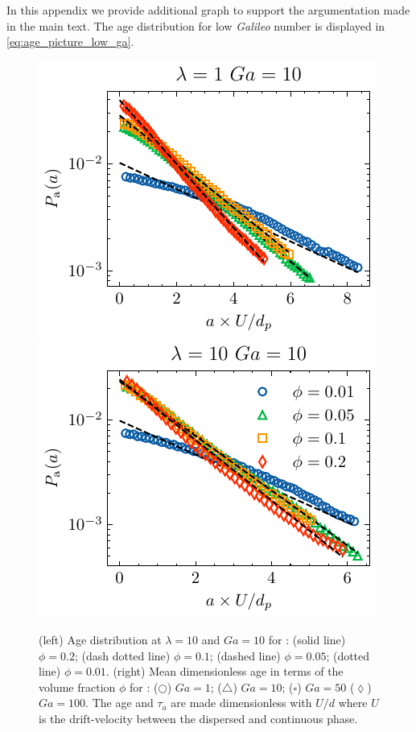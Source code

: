 In this appendix we provide additional graph to support the argumentation made in the main text. 
The age distribution for low \textit{Galileo} number is displayed in \ref{eq:age_picture_low_ga}. 
\begin{figure}[h!]
    \centering
    \includegraphics[height = 0.3\textwidth]{image/HOMOGENEOUS_NEW/Dist/Pa_l_1_Ga_10.pdf}
    \includegraphics[height = 0.3\textwidth]{image/HOMOGENEOUS_NEW/Dist/Pa_l_10_Ga_10.pdf}
    \caption{(left) Age distribution at $\lambda = 10$ and $Ga = 10$ for : (solid line) $\phi = 0.2$; (dash dotted line) $\phi = 0.1$; (dashed line) $\phi =0.05$; (dotted line) $\phi = 0.01$. 
    (right) Mean dimensionless age in terms of the volume fraction $\phi$ for : 
    ($\pmb\bigcirc$) $Ga=1$; ($\pmb\triangle$) $ Ga = 10$; ($\pmb\square$) $Ga = 50$ ($\pmb\lozenge$) $Ga =100$.
    The age and $\tau_a$ are made dimensionless with $U/d$ where $U$ is the drift-velocity between the dispersed and continuous phase.  }
    \label{fig:age_picture_low_ga}
\end{figure}